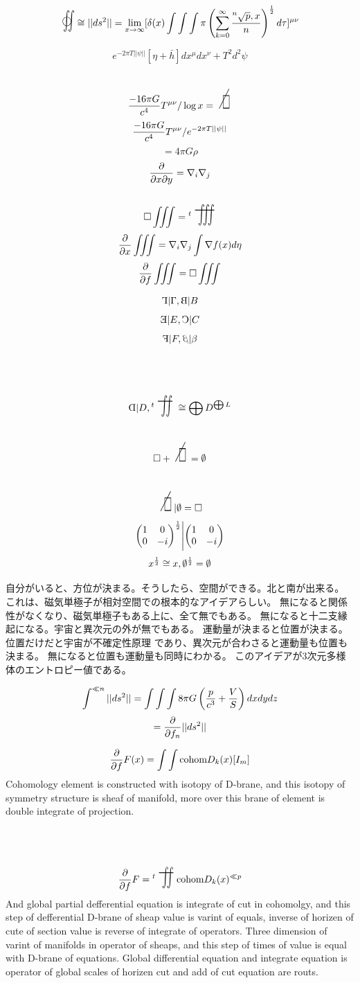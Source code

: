 \documentclass{jsarticle}
\begin{document}
 $$\oiint  \cong  ||ds^2|| = \lim_{x \to \infty} 
 [\delta(x) \int \int \int \pi \left( \sum_{k=0}^{\infty}
		{{}^n\sqrt{p},x \over n} 
		\right)^{1 \over 2}d \tau]^{\mu\nu} $$
 
 $$ e^{-2\pi T||\psi||}[\eta + \bar{h}]dx^{\mu}dx^{\nu} + T^2 d^2 \psi $$
 $$ {{-16 \pi G} \over c^4}T^{\mu\nu}/ \log x =  
 \scalebox{1}[2]{\alearletter} $$
 $${{-16 \pi G} \over c^4}T^{\mu\nu}/ e^{-2\pi T||\psi||} $$
 $$ = 4 \pi G \rho $$
 $$ {\partial \over {\partial x \partial y}} = \nabla_{i} \nabla_{j} $$ 
 $$ \square \iiint  = {}^{t}\scalebox{1}[2]{\variiint}\ $$
 $$ {\partial \over {\partial x}} \iiint = \nabla_{i}\nabla_{j} \int
 \nabla f(x) d \eta $$
 $$ {\partial \over {\partial f}}\iiint = \square \iiint $$

 $$ \reflectbox{$\Gamma$} | \Gamma, \reflectbox{B} | B $$
 $$ \reflectbox{E} | E, \reflectbox{C} | C $$
 $$ \reflectbox{F} | F, \reflectbox{$\beta$} | \beta $$
 $$ \reflectbox{D} | D, {}^{t}\scalebox{1}[2]{\variint} \cong 
 \bigoplus D^{\bigoplus L} $$
 $$ \square +  \scalebox{1}[2]{\alearletter} = \emptyset $$
 $$  \scalebox{1}[2]{\alearletter} | \emptyset = \square $$
 $$ {\begin{pmatrix} 1 & 0 \\
 0 & -i \end{pmatrix}}^{1 \over 2} \Biggl| {\begin{pmatrix} 1 & 0 \\
 0 & -i \end{pmatrix}}$$
 $$ x^{1 \over 2} \cong x, \emptyset^{1 \over 2} = \emptyset$$
 
    自分がいると、方位が決まる。そうしたら、空間ができる。北と南が出来る。
    これは、磁気単極子が相対空間での根本的なアイデアらしい。
    無になると関係性がなくなり、磁気単極子もある上に、全て無でもある。
    無になると十二支縁起になる。宇宙と異次元の外が無でもある。
    運動量が決まると位置が決まる。位置だけだと宇宙が不確定性原理
    であり、異次元が合わさると運動量も位置も決まる。
    無になると位置も運動量も同時にわかる。
    このアイデアが3次元多様体のエントロピー値である。
    
    $$ \int^{\ll n} ||ds^2|| = \int\int\int 8 \pi G \left({p \over c^3} + 
    {V \over S}\right)dxdydz $$
    $$ = {\partial \over \partial f_n}{||ds^2||} $$


 $$ {\partial \over \partial f}F(x) = \int \int \text{cohom}D_k(x)[I_m]  $$
 Cohomology element is constructed with isotopy of D-brane,
 and this isotopy of symmetry structure is sheaf of manifold,
 more over this brane of element is double integrate of projection.
 $$ {\partial \over \partial f}F = {{}^t \scalebox{1}[2]{\variint}}
 \text{cohom}D_k(x)^{\ll p} $$
 And global partial defferential equation is integrate of cut in cohomolgy,
 and this step of defferential D-brane of sheap value is varint of equals,
 inverse of horizen of cute of section value is reverse of integrate of 
 operators. Three dimension of varint of manifolds in operator of sheaps,
 and this step of times of value is equal with D-brane of equations.
 Global differential equation and integrate equation is operator of 
 global scales of horizen cut and add of cut equation are routs.
\end{document}
